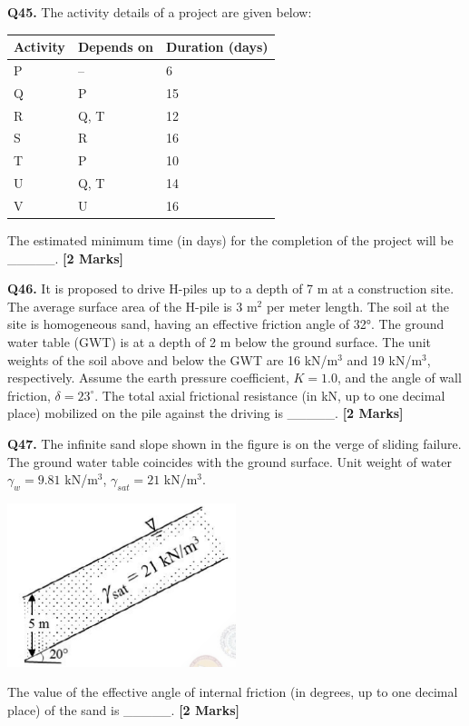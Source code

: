 \documentclass[11pt]{article}
\newcommand{\questionb}[2]{
    \noindent\textbf{Q#2.} #1 \hfill \textbf{[2 Marks]}
}
\begin{document}
\vspace{0.5cm}

\questionb{The activity details of a project are given below:
\begin{center}
\begin{tabular}{|l|l|l|}
\hline
Activity & Depends on & Duration (days) \\
\hline
P & -- & 6 \\
Q & P & 15 \\
R & Q, T & 12 \\
S & R & 16 \\
T & P & 10 \\
U & Q, T & 14 \\
V & U & 16 \\
\hline
\end{tabular}
\end{center}
The estimated minimum time (in days) for the completion of the project will be \_\_\_\_\_.}{45}

\vspace{0.5cm}

\questionb{It is proposed to drive H-piles up to a depth of 7 m at a construction site. The average surface area of the H-pile is 3 m$^2$ per meter length. The soil at the site is homogeneous sand, having an effective friction angle of 32°. The ground water table (GWT) is at a depth of 2 m below the ground surface. The unit weights of the soil above and below the GWT are 16 kN/m$^3$ and 19 kN/m$^3$, respectively. Assume the earth pressure coefficient, $K = 1.0$, and the angle of wall friction, $\delta = 23^\circ$. The total axial frictional resistance (in kN, up to one decimal place) mobilized on the pile against the driving is \_\_\_\_\_.}{46}

\vspace{0.5cm}

\questionb{The infinite sand slope shown in the figure is on the verge of sliding failure. The ground water table coincides with the ground surface. Unit weight of water $\gamma_w = 9.81$ kN/m$^3$, $\gamma_{sat} = 21$ kN/m$^3$.
\begin{center}
\includegraphics[width=0.5\textwidth]{figures/47.png}
\end{center}
The value of the effective angle of internal friction (in degrees, up to one decimal place) of the sand is \_\_\_\_\_.}{47}
\end{document}
